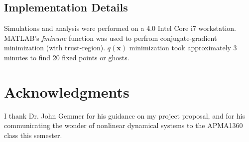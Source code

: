 \documentclass{article} %
\newcommand{\bf}[1]{\mathbf{#1}}
\newcommand{\x}{\bf{x}}
\begin{document}
\subsection{Implementation Details}

Simulations and analysis were performed on a 4.0 Intel Core i7 workstation. MATLAB's \textit{fminunc} function was used to perfrom conjugate-gradient minimization (with trust-region). $q(\x)$ minimization took approximately 3 minutes to find 20 fixed points or ghosts.

\section*{Acknowledgments}

I thank Dr. John Gemmer for his guidance on my project proposal, and for his communicating the wonder of nonlinear dynamical systems to the APMA1360 class this semester.



\end{document}
